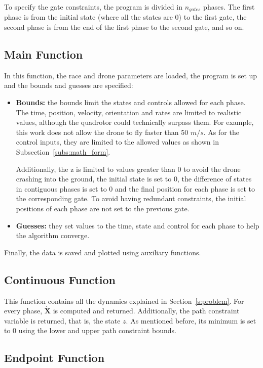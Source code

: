 \documentclass[letterpaper, 10 pt, conference]{ieeeconf}  %
\begin{document}
To specify the gate constraints, the program is divided in $n_{gates}$ phases. The first phase is from the initial state (where all the states are 0) to the first gate, the second phase is from the end of the first phase to the second gate, and so on.

\subsection{Main Function}
In this function, the race and drone parameters are loaded, the program is set up and the bounds and guesses are specified:
\begin{itemize}
	\item \textbf{Bounds:} the bounds limit the states and controls allowed for each phase. The time, position, velocity, orientation and rates are limited to realistic values, although the quadrotor could technically surpass them. For example, this work does not allow the drone to fly faster than 50 $m/s$. As for the control inputs, they are limited to the allowed values as shown in Subsection~\ref{subs:math_form}.
	
	Additionally, the z is limited to values greater than 0 to avoid the drone crashing into the ground, the initial state is set to 0, the difference of states in contiguous phases is set to 0 and the final position for each phase is set to the corresponding gate. To avoid having redundant constraints, the initial positions of each phase are not set to the previous gate.
	\item \textbf{Guesses:} they set values to the time, state and control for each phase to help the algorithm converge.
\end{itemize}

Finally, the data is saved and plotted using auxiliary functions.

\subsection{Continuous Function}

This function contains all the dynamics explained in Section~\ref{s:problem}. For every phase, $\bm{\dot{X}}$ is computed and returned. Additionally, the path constraint variable is returned, that is, the state $z$. As mentioned before, its minimum is set to 0 using the lower and upper path constraint bounds.

\subsection{Endpoint Function}
\end{document}
